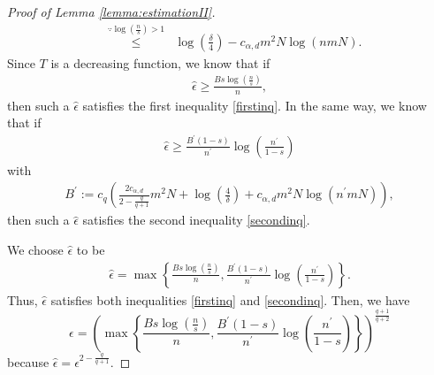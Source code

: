 \documentclass{article}
\begin{document}
\begin{proof}[Proof of Lemma \ref{lemma:estimationII}]
\begin{eqnarray*}
&\stackrel{\because \log (\frac{n}{s}) > 1}{\leq}& \log \left(\frac{\delta}{4}\right) -  c_{\alpha, d} m^2  N\log(nmN). 
\end{eqnarray*}
Since $T$ is a decreasing function, we know that if
\begin{eqnarray*}
  \hat \epsilon \geq  \frac{Bs\log \left(\frac{n}{s}\right)}{n}
,
\end{eqnarray*}
then such a $\hat \epsilon$ satisfies the first inequality \eqref{firstinq}.
In the same way, we know that if
\begin{eqnarray*}
    \hat\epsilon \geq \frac{B^\prime(1-s)}{n^\prime}\log \left(\frac{n^\prime}{1-s}\right)
\end{eqnarray*}
with \begin{eqnarray*}
    B^\prime:=c_{q} \left(\frac{2c_{\alpha, d}}{2-{\frac{q}{q+1}}} m^2 N + \log \left(\frac{4}{\delta}\right) + c_{\alpha, d} m^2 N\log(n^\prime mN)\right),  
\end{eqnarray*}
then such a $\hat\epsilon$ satisfies the second inequality \eqref{secondinq}.

We choose $\hat \epsilon$ to be  
\begin{eqnarray*}
   \hat\epsilon =  \max \left\{  \frac{Bs\log \left(\frac{n}{s}\right)}{n}
, \frac{B^\prime(1-s)}{n^\prime}\log \left(\frac{n^\prime}{1-s}\right) \right\}.
\end{eqnarray*}
Thus, $\hat\epsilon $ satisfies both inequalities \eqref{firstinq} and \eqref{secondinq}. Then, we have  \begin{equation}\label{choice_of_epsilon}
    \epsilon =   \left(\max\left\{  \frac{Bs\log \left(\frac{n}{s}\right)}{n}
, \frac{B^\prime(1-s)}{n^\prime}\log \left(\frac{n^\prime}{1-s}\right) \right\}\right)^{\frac{q+1}{q+2} }
\end{equation}
because $\hat \epsilon = \epsilon^{2-{\frac{q}{q+1}}}$.


\end{proof}
\end{document}
